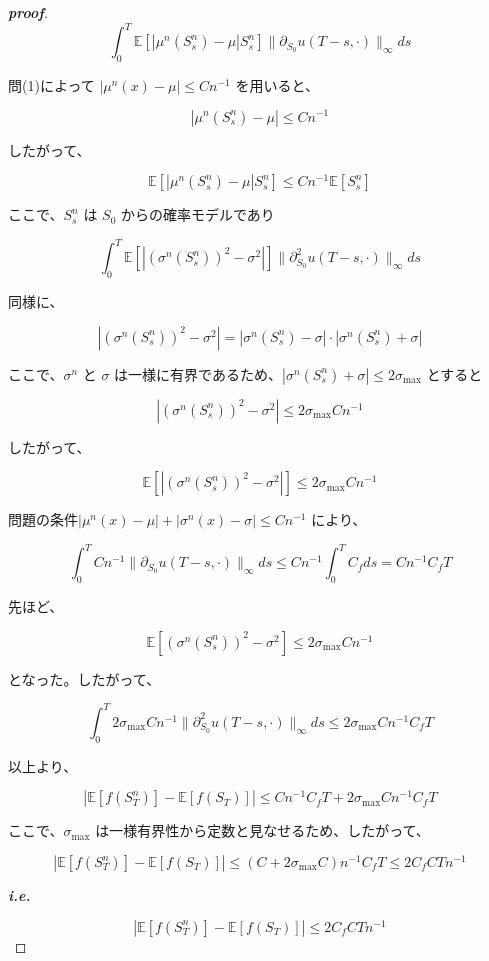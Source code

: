 \documentclass[a4paper]{jsarticle}
\makeatletter
\newcommand*{\ie}{\textbf{\textit{i.e.}}\@\xspace}
\makeatother
\begin{document}
\begin{proof}[\textbf{proof}]
\[  
\int_0^T \mathbb{E}[|\mu^n(S_s^n) - \mu|S_s^n]\|\partial_{S_0}u(T-s,\cdot)\|_\infty ds  
\]  

問(1)によって $|\mu^n(x) - \mu| \leq Cn^{-1}$ を用いると、  

\[  
|\mu^n(S_s^n) - \mu| \leq Cn^{-1}  
\]  

したがって、  

\[  
\mathbb{E}[|\mu^n(S_s^n) - \mu|S_s^n] \leq Cn^{-1}\mathbb{E}[S_s^n]  
\]  

ここで、$S_s^n$ は $S_0$ からの確率モデルであり

\[  
\int_0^T \mathbb{E}[|(\sigma^n(S_s^n))^2 - \sigma^2|]\|\partial_{S_0}^2u(T-s,\cdot)\|_\infty ds  
\]  

同様に、

\[  
|(\sigma^n(S_s^n))^2 - \sigma^2| = |\sigma^n(S_s^n) - \sigma| \cdot |\sigma^n(S_s^n) + \sigma|  
\]  

ここで、$\sigma^n$ と $\sigma$ は一様に有界であるため、$|\sigma^n(S_s^n) + \sigma| \leq 2\sigma_{\max}$ とすると  

\[  
|(\sigma^n(S_s^n))^2 - \sigma^2| \leq 2\sigma_{\max}Cn^{-1}  
\]  

したがって、  

\[  
\mathbb{E}[|(\sigma^n(S_s^n))^2 - \sigma^2|] \leq 2\sigma_{\max}Cn^{-1}  
\]

問題の条件$|\mu^n(x) - \mu| + |\sigma^n(x) - \sigma| \leq Cn^{-1}$ により、


\[  
\int_0^T Cn^{-1}\|\partial_{S_0}u(T-s,\cdot)\|_\infty ds \leq Cn^{-1} \int_0^T C_f ds = Cn^{-1}C_fT  
\]  
  

先ほど、  

\[  
\mathbb{E}[(\sigma^n(S_s^n))^2 - \sigma^2] \leq 2\sigma_{\max}Cn^{-1}  
\]  

となった。したがって、  

\[  
\int_0^T 2\sigma_{\max}Cn^{-1}\|\partial_{S_0}^2 u(T-s,\cdot)\|_\infty ds \leq 2\sigma_{\max}Cn^{-1}C_fT  
\]  

以上より、  

\[  
|\mathbb{E}[f(S_T^n)] - \mathbb{E}[f(S_T)]| \leq Cn^{-1}C_fT + 2\sigma_{\max}Cn^{-1}C_fT  
\]  

ここで、$\sigma_{\max}$ は一様有界性から定数と見なせるため、したがって、  

\[  
|\mathbb{E}[f(S_T^n)] - \mathbb{E}[f(S_T)]| \leq (C + 2\sigma_{\max}C)n^{-1}C_fT \leq 2C_fCTn^{-1}  
\]

\ie\quad 

$$|\mathbb{E}[f(S_T^n)] - \mathbb{E}[f(S_T)]| \leq 2C_f CTn^{-1}  $$
\end{proof}
\end{document}

